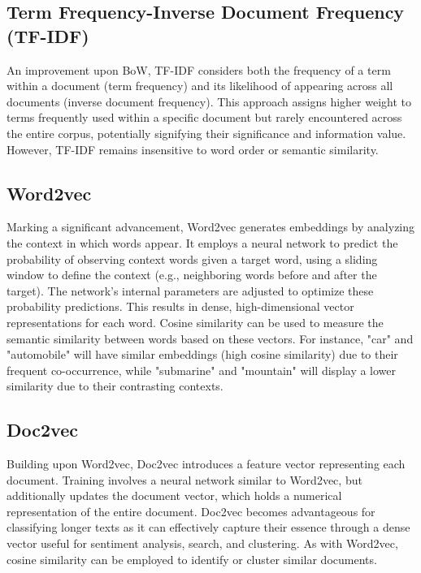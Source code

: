 \documentclass[12pt,a4paper]{report}
\begin{document}
\subsection{Term Frequency-Inverse Document Frequency (TF-IDF)} An improvement upon BoW, TF-IDF considers both the frequency of a term within a document (term frequency) and its likelihood of appearing across all documents (inverse document frequency)\citep{grootendorst2022bertopic}. This approach assigns higher weight to terms frequently used within a specific document but rarely encountered across the entire corpus, potentially signifying their significance and information value. However, TF-IDF remains insensitive to word order or semantic similarity.

\subsection{Word2vec} Marking a significant advancement, Word2vec generates embeddings by analyzing the context in which words appear. It employs a neural network to predict the probability of observing context words given a target word, using a sliding window to define the context (e.g., neighboring words before and after the target)\citep{goldberg2014word2vec}. The network's internal parameters are adjusted to optimize these probability predictions. This results in dense, high-dimensional vector representations for each word. Cosine similarity can be used to measure the semantic similarity between words based on these vectors. For instance, "car" and "automobile" will have similar embeddings (high cosine similarity) due to their frequent co-occurrence, while "submarine" and "mountain" will display a lower similarity due to their contrasting contexts.

\subsection{Doc2vec} Building upon Word2vec, Doc2vec introduces a feature vector representing each document\citep{le2014distributed}. Training involves a neural network similar to Word2vec, but additionally updates the document vector, which holds a numerical representation of the entire document. Doc2vec becomes advantageous for classifying longer texts as it can effectively capture their essence through a dense vector useful for sentiment analysis, search, and clustering. As with Word2vec, cosine similarity can be employed to identify or cluster similar documents.
\end{document}
